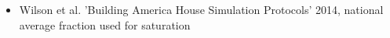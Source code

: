 \begin{itemize}
\item Wilson et al. 'Building America House Simulation Protocols' 2014, national average fraction used for saturation
\end{itemize}
